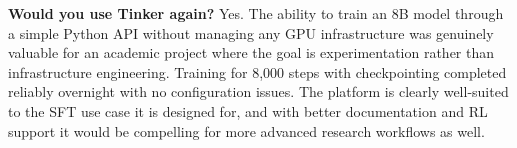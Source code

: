 \documentclass[10pt,letterpaper]{article}
\begin{document}
\textbf{Would you use Tinker again?} Yes. The ability to train an 8B model through a 
simple Python API without managing any GPU infrastructure was genuinely valuable for an 
academic project where the goal is experimentation rather than infrastructure 
engineering. Training for 8,000 steps with checkpointing completed reliably overnight 
with no configuration issues. The platform is clearly well-suited to the SFT use case 
it is designed for, and with better documentation and RL support it would be compelling 
for more advanced research workflows as well.
\end{document}
